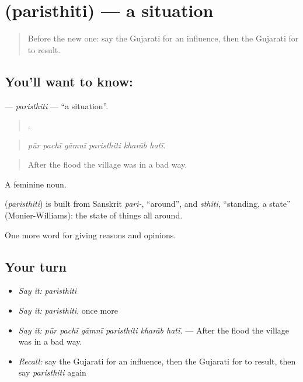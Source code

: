 \section[\texorpdfstring{\gu{પરિસ્થિતિ} (paristhiti)}{પરિસ્થિતિ (paristhiti)}]{ (paristhiti) — a situation}

\label{lesson:GU-C339-paristhiti}



\begin{quote}
Before the new one: say the Gujarati for an influence, then the Gujarati for to result.
\end{quote}

\subsection*{You'll want to know: }
\textbf{} — \emph{paristhiti} — \textquotedblleft{}a situation\textquotedblright{}.

\begin{quote}
     .
\end{quote}

\begin{quote}
\emph{pūr pachī gāmnī paristhiti kharāb hatī.}
\end{quote}

\begin{quote}
After the flood the village was in a bad way.
\end{quote}

A feminine noun.

\begin{cousinweb}
\textbf{} (\emph{paristhiti}) is built from Sanskrit \emph{pari-}, \textquotedblleft{}around\textquotedblright{}, and \emph{sthiti}, \textquotedblleft{}standing, a state\textquotedblright{} (Monier-Williams): the state of things all around.
\end{cousinweb}

\begin{grammarlens}[title={What you've built}]
One more word for giving reasons and opinions.
\end{grammarlens}

\subsection*{Your turn}
\begin{itemize}
\raggedright
  \item \emph{Say it:} \emph{paristhiti}
  \item \emph{Say it:} \emph{paristhiti}, once more
  \item \emph{Say it:} \emph{pūr pachī gāmnī paristhiti kharāb hatī.} — After the flood the village was in a bad way.
  \item \emph{Recall:} say the Gujarati for an influence, then the Gujarati for to result, then say \emph{paristhiti} again
\end{itemize}

